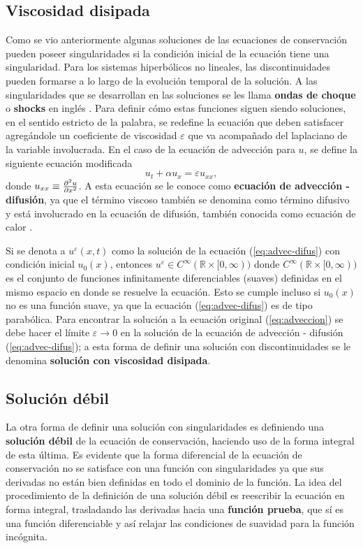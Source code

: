 \subsection{Viscosidad disipada}
Como se vio anteriormente algunas soluciones de las ecuaciones de conservación pueden poseer singularidades si la condición inicial de la ecuación tiene una singularidad. Para los sistemas hiperbólicos no lineales, las discontinuidades pueden formarse a lo largo de la evolución temporal de la solución. A las singularidades que se desarrollan en las soluciones se les llama \textbf{ondas de choque} o \textbf{shocks} en inglés \cite{Cameron}. Para definir cómo estas funciones siguen siendo soluciones, en el sentido estricto de la palabra, se redefine la ecuación que deben satisfacer agregándole un coeficiente de viscosidad $\varepsilon$ que va acompañado del laplaciano de la variable involucrada. En el caso de la ecuación de advección para $u$, se define la siguiente ecuación modificada
\begin{equation}
	u_t + \alpha u_x = \varepsilon u_{xx},
	\label{eq:advec-difus}
\end{equation}
donde $u_{xx} \equiv \pdv[2]{u}{x}$. A esta ecuación se le conoce como \textbf{ecuación de advección - difusión}, ya que el término viscoso también se denomina como término difusivo y está involucrado en la ecuación de difusión, también conocida como ecuación de calor \cite{heattransfer}. 

Si se denota a $u^{\varepsilon}(x,t)$ como la solución de la ecuación (\ref{eq:advec-difus}) con condición inicial $u_0(x)$, entonces $u^{\varepsilon} \in C^{\infty}(\mathbb{R} \times [0,\infty)) $ donde $ C^{\infty}(\mathbb{R}\times [0,\infty))$ es el conjunto de funciones infinitamente diferenciables (suaves) definidas en el mismo espacio en donde se resuelve la ecuación. Esto se cumple incluso si $u_0(x)$ no es una función suave, ya que la ecuación (\ref{eq:advec-difus}) es de tipo parabólica. Para encontrar la solución a la ecuación original (\ref{eq:adveccion}) se debe hacer el límite $\varepsilon \rightarrow 0$ en la solución de la ecuación de advección - difusión (\ref{eq:advec-difus}); a esta forma de definir una solución con discontinuidades se le denomina \textbf{solución con viscosidad disipada}.
\subsection{Solución débil}
La otra forma de definir una solución con singularidades es definiendo una \textbf{solución débil} de la ecuación de conservación, haciendo uso de la forma integral de esta última. Es evidente que la forma diferencial de la ecuación de conservación no se satisface con una función con singularidades ya que sus derivadas no están bien definidas en todo el dominio de la función. La idea del procedimiento de la definición de una solución débil es reescribir la ecuación en forma integral, trasladando las derivadas hacia una \textbf{función prueba}, que sí es una función diferenciable y así relajar las condiciones de suavidad para la función incógnita.

